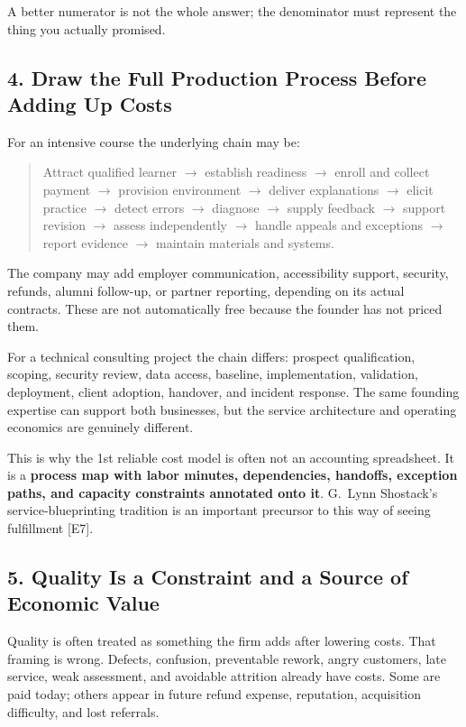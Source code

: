 A better numerator is not the whole answer; the denominator must represent the thing you actually promised.

\subsection*{4. Draw the Full Production Process Before Adding Up Costs}

For an intensive course the underlying chain may be:

\begin{quote}
Attract qualified learner $\rightarrow$ establish readiness $\rightarrow$ enroll and collect payment $\rightarrow$ provision environment $\rightarrow$ deliver explanations $\rightarrow$ elicit practice $\rightarrow$ detect errors $\rightarrow$ diagnose $\rightarrow$ supply feedback $\rightarrow$ support revision $\rightarrow$ assess independently $\rightarrow$ handle appeals and exceptions $\rightarrow$ report evidence $\rightarrow$ maintain materials and systems.
\end{quote}

The company may add employer communication, accessibility support, security, refunds, alumni follow-up, or partner reporting, depending on its actual contracts. These are not automatically free because the founder has not priced them.

For a technical consulting project the chain differs: prospect qualification, scoping, security review, data access, baseline, implementation, validation, deployment, client adoption, handover, and incident response. The same founding expertise can support both businesses, but the service architecture and operating economics are genuinely different.

This is why the 1st reliable cost model is often not an accounting spreadsheet. It is a \textbf{process map with labor minutes, dependencies, handoffs, exception paths, and capacity constraints annotated onto it}. G.~Lynn Shostack's service-blueprinting tradition is an important precursor to this way of seeing fulfillment [E7].

\subsection*{5. Quality Is a Constraint and a Source of Economic Value}

Quality is often treated as something the firm adds after lowering costs. That framing is wrong. Defects, confusion, preventable rework, angry customers, late service, weak assessment, and avoidable attrition already have costs. Some are paid today; others appear in future refund expense, reputation, acquisition difficulty, and lost referrals.

